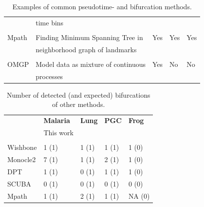\begin{table}
\begin{tabularx}{0.95\textwidth}{lllll}
\cite{Marco2014-rf} & time bins & & & \\  & & & & \\
Mpath & Finding Minimum Spanning Tree in & Yes & Yes & Yes \\
\cite{Chen2016-ar} & neighborhood graph of landmarks &  & &  \\ & & & & \\
OMGP & Model data as mixture of continuous& Yes & No & No \\
& processes & & & \\
\end{tabularx}
\caption{Examples of common pseudotime- and bifurcation methods.}
\label{tab:alternatives}
\end{table}

\begin{table}
\centering
\begin{tabularx}{0.95\textwidth}{lllll}
 & \textbf{Malaria} & \textbf{Lung} & \textbf{PGC} & \textbf{Frog} \\
 & This work & \cite{Treutlein2014-rz} & \cite{Guo2015-ao} & \cite{Owens2016-op} \\
\hline \\ 
Wishbone & 1 (1) & 1 (1) & 1 (1) & 1 (0) \\
Monocle2 & 7 (1) & 1 (1) & 2 (1) & 1 (0) \\
DPT & 1 (1) & 0 (1) & 1 (1) & 1 (0) \\
SCUBA & 0 (1) & 0 (1) & 0 (1) & 0 (0) \\
Mpath & 1 (1) & 2 (1) & 1 (1) & NA (0) \\
\end{tabularx}
\caption{Number of detected (and expected) bifurcations of other methods.}
\label{tab:alternatives_out}
\end{table}
